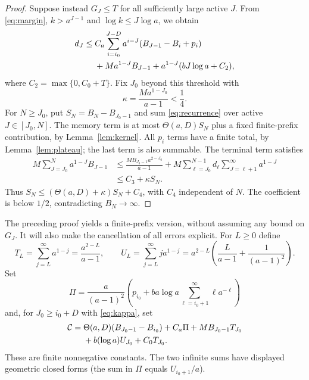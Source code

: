\documentclass[11pt]{article}
\theoremstyle{remark}\newtheorem{remark}[theorem]{Remark}
\begin{document}
\begin{proof}
Suppose instead $G_J\le T$ for all sufficiently large active $J$.
From \eqref{eq:margin}, $k>a^{J-1}$ and $\log k\le J\log a$, we obtain
\begin{align}
 d_J\le{}&C_a\sum_{i=i_0}^{J-D}a^{i-J}(B_{J-1}-B_i+p_i)\notag\\
 &+Ma^{1-J}B_{J-1}
    +a^{1-J}(bJ\log a+C_2),\label{eq:recurrence}
\end{align}
where $C_2=\max\{0,C_0+T\}$. Fix $J_0$ beyond this threshold with
\begin{equation}\label{eq:kappa}
 \kappa=\frac{Ma^{1-J_0}}{a-1}<\frac14.
\end{equation}
For $N\ge J_0$, put $S_N=B_N-B_{J_0-1}$ and sum
\eqref{eq:recurrence} over active $J\in[J_0,N]$. The memory term is at
most $\Theta(a,D)S_N$ plus a fixed finite-prefix contribution, by
Lemma~\ref{lem:kernel}. All $p_i$ terms have a finite total, by
Lemma~\ref{lem:plateau}; the last term is also summable.
The terminal term satisfies
\begin{align*}
 M\sum_{J=J_0}^N a^{1-J}B_{J-1}
 &\le\frac{MB_{J_0-1}a^{2-J_0}}{a-1}
    +M\sum_{\ell=J_0}^{N-1}d_\ell
                    \sum_{J=\ell+1}^{\infty}a^{1-J}\\
 &\le C_3+\kappa S_N.
\end{align*}
Thus $S_N\le(\Theta(a,D)+\kappa)S_N+C_4$, with $C_4$ independent of $N$.
The coefficient is below $1/2$, contradicting $B_N\to\infty$.
\end{proof}

The preceding proof yields a finite-prefix version, without assuming any
bound on $G_J$. It will also make the cancellation of all errors explicit.
For $L\ge0$ define
\[
 T_L=\sum_{j=L}^{\infty}a^{1-j}=\frac{a^{2-L}}{a-1},\qquad
 U_L=\sum_{j=L}^{\infty}j a^{1-j}
 =a^{2-L}\left(\frac{L}{a-1}+\frac1{(a-1)^2}\right).
\]
Set
\[
 \Pi=\frac{a}{(a-1)^2}
   \left(p_{i_0}+ba\log a\sum_{\ell=i_0+1}^{\infty}\ell a^{-\ell}\right)
\]
and, for $J_0\ge i_0+D$ with \eqref{eq:kappa}, set
\begin{align}
 \mathcal C={}&\Theta(a,D)(B_{J_0-1}-B_{i_0})+C_a\Pi
       +MB_{J_0-1}T_{J_0}\notag\\
       &+b(\log a)U_{J_0}+C_0T_{J_0}.\label{eq:explicitC}
\end{align}
These are finite nonnegative constants. The two infinite sums have displayed
geometric closed forms (the sum in $\Pi$ equals $U_{i_0+1}/a$).
\end{document}
